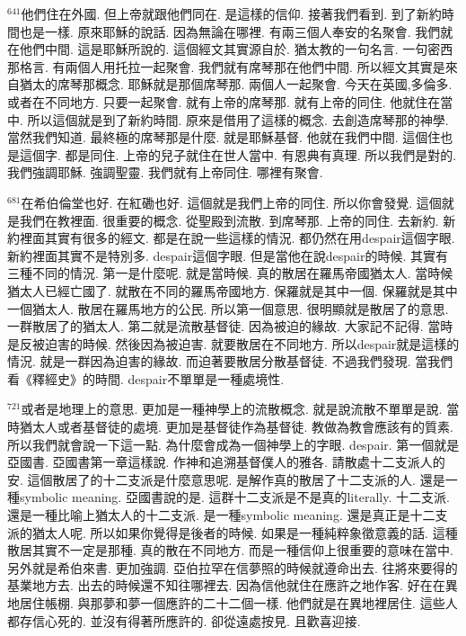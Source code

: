 \documentclass{book}
\begin{document}
$^{641}$他們住在外國.
但上帝就跟他們同在.
是這樣的信仰.
接著我們看到.
到了新約時間也是一樣.
原來耶穌的說話.
因為無論在哪裡.
有兩三個人奉安的名聚會.
我們就在他們中間.
這是耶穌所說的.
這個經文其實源自於.
猶太教的一句名言.
一句密西那格言.
有兩個人用托拉一起聚會.
我們就有席琴那在他們中間.
所以經文其實是來自猶太的席琴那概念.
耶穌就是那個席琴那.
兩個人一起聚會.
今天在英國,多倫多.
或者在不同地方.
只要一起聚會.
就有上帝的席琴那.
就有上帝的同住.
他就住在當中.
所以這個就是到了新約時間.
原來是借用了這樣的概念.
去創造席琴那的神學.
當然我們知道.
最終極的席琴那是什麼.
就是耶穌基督.
他就在我們中間.
這個住也是這個字.
都是同住.
上帝的兒子就住在世人當中.
有恩典有真理.
所以我們是對的.
我們強調耶穌.
強調聖靈.
我們就有上帝同住.
哪裡有聚會.

$^{681}$在希伯倫堂也好.
在紅磡也好.
這個就是我們上帝的同住.
所以你會發覺.
這個就是我們在教裡面.
很重要的概念.
從聖殿到流散.
到席琴那.
上帝的同住.
去新約.
新約裡面其實有很多的經文.
都是在說一些這樣的情況.
都仍然在用despair這個字眼.
新約裡面其實不是特別多.
despair這個字眼.
但是當他在說despair的時候.
其實有三種不同的情況.
第一是什麼呢.
就是當時候.
真的散居在羅馬帝國猶太人.
當時候猶太人已經亡國了.
就散在不同的羅馬帝國地方.
保羅就是其中一個.
保羅就是其中一個猶太人.
散居在羅馬地方的公民.
所以第一個意思.
很明顯就是散居了的意思.
一群散居了的猶太人.
第二就是流散基督徒.
因為被迫的緣故.
大家記不記得.
當時是反被迫害的時候.
然後因為被迫害.
就要散居在不同地方.
所以despair就是這樣的情況.
就是一群因為迫害的緣故.
而迫著要散居分散基督徒.
不過我們發現.
當我們看《釋經史》的時間.
despair不單單是一種處境性.

$^{721}$或者是地理上的意思.
更加是一種神學上的流散概念.
就是說流散不單單是說.
當時猶太人或者基督徒的處境.
更加是基督徒作為基督徒.
教做為教會應該有的質素.
所以我們就會說一下這一點.
為什麼會成為一個神學上的字眼.
despair.
第一個就是亞國書.
亞國書第一章這樣說.
作神和追溯基督僕人的雅各.
請散處十二支派人的安.
這個散居了的十二支派是什麼意思呢.
是解作真的散居了十二支派的人.
還是一種symbolic meaning.
亞國書說的是.
這群十二支派是不是真的literally.
十二支派.
還是一種比喻上猶太人的十二支派.
是一種symbolic meaning.
還是真正是十二支派的猶太人呢.
所以如果你覺得是後者的時候.
如果是一種純粹象徵意義的話.
這種散居其實不一定是那種.
真的散在不同地方.
而是一種信仰上很重要的意味在當中.
另外就是希伯來書.
更加強調.
亞伯拉罕在信夢照的時候就遵命出去.
往將來要得的基業地方去.
出去的時候還不知往哪裡去.
因為信他就住在應許之地作客.
好在在異地居住帳棚.
與那夢和夢一個應許的二十二個一樣.
他們就是在異地裡居住.
這些人都存信心死的.
並沒有得著所應許的.
卻從遠處按見.
且歡喜迎接.
\end{document}
